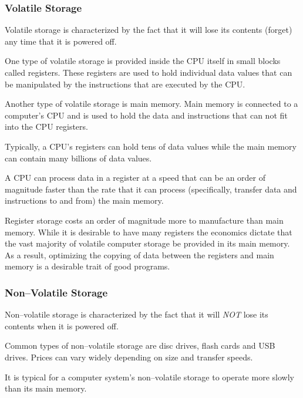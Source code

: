 \subsubsection{Volatile Storage}

Volatile storage is characterized by the fact that it will lose its
contents (forget) any time that it is powered off.

One type of volatile storage is provided inside the CPU itself in 
small blocks called \glspl{register}.  These registers are used to 
hold individual data values that can be manipulated by the instructions
that are executed by the CPU.  

Another type of volatile storage is main memory.
Main memory is connected to a computer's CPU and is used to hold
the data and instructions that can not fit into the CPU registers.

Typically, a CPU's registers can hold tens of data values while
the main memory can contain many billions of data values.

A CPU can process data in a register at a speed that can be an order 
of magnitude faster than the rate that it can process (specifically,
transfer data and instructions to and from) the main memory.  

Register storage costs an order of magnitude more to manufacture than
main memory.  While it is desirable to have many registers the economics 
dictate that the vast majority of volatile computer storage be provided
in its main memory.  As a result, optimizing the copying of data between 
the registers and main memory is a desirable trait of good programs.

\subsubsection{Non--Volatile Storage}

Non--volatile storage is characterized by the fact that it will {\em NOT} 
lose its contents when it is powered off.

Common types of non--volatile storage are disc drives, flash cards and USB 
drives.  Prices can vary widely depending on size and transfer speeds.

It is typical for a computer system's non--volatile storage to operate
more slowly than its main memory.

